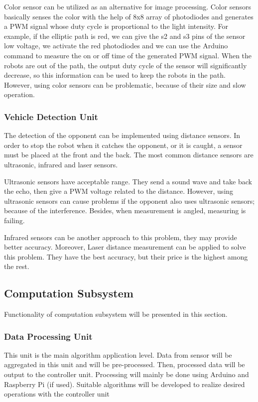 \documentclass[a4paper,12pt]{article}
\begin{document}
Color sensor can be utilized as an alternative for image processing. Color sensors basically senses the color with the help of 8x8 array of photodiodes and generates a PWM signal whose duty cycle is proportional to the light intensity. For example, if the elliptic path is red, we can give the s2 and s3 pins of the sensor low voltage, we activate the red photodiodes and we can use the Arduino command to measure the on or off time of the generated PWM signal. When the robots are out of the path, the output duty cycle of the sensor will significantly decrease, so this information can be used to keep the robots in the path. However, using color sensors can be problematic, because of their size and slow operation.

\subsubsection{Vehicle Detection Unit}
The detection of the opponent can be implemented using distance sensors. In order to stop the robot when it catches the opponent, or it is caught, a sensor must be placed at the front and the back. The most common distance sensors are ultrasonic, infrared and laser sensors. 

Ultrasonic sensors have acceptable range. They send a sound wave and take back the echo, then give a PWM voltage related to the distance. However, using ultrasonic sensors can cause problems if the opponent also uses ultrasonic sensors; because of the interference. Besides, when measurement is angled, measuring is failing. 

Infrared sensors can be another approach to this problem, they may provide better accuracy. Moreover, Laser distance measurement can be applied to solve this problem. They have the best accuracy, but their price is the highest among the rest.
\subsection{Computation Subsystem}
Functionality of computation subsystem will be presented in this section.
\subsubsection{Data Processing Unit}
This unit is the main algorithm application level. Data from sensor will be aggregated in this unit and will be pre-processed. Then, processed data will be output to the controller unit. Processing will mainly be done using Arduino and Raspberry Pi (if used). Suitable algorithms will be developed to realize desired operations with the controller unit
\end{document}
